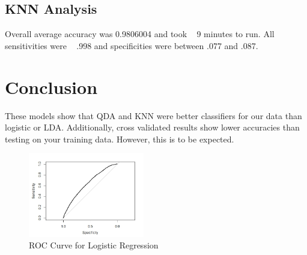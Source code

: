 \documentclass[10pt,twocolumn,letterpaper]{article}
\begin{document}
\subsection{KNN Analysis}
Overall average accuracy was 0.9806004 and took ~ 9 minutes to run. All sensitivities were ~ .998 and specificities were between .077 and .087.


\section{Conclusion}
These models show that QDA and KNN were better classifiers for our data than logistic or LDA. Additionally, cross validated results show lower accuracies than testing on your training data. However, this is to be expected.


\begin{figure}
	\includegraphics[width=0.45\textwidth]{images/ROC}
	\caption{ROC Curve for Logistic Regression}
	\label{fig:ROC}
\end{figure}
\end{document}
